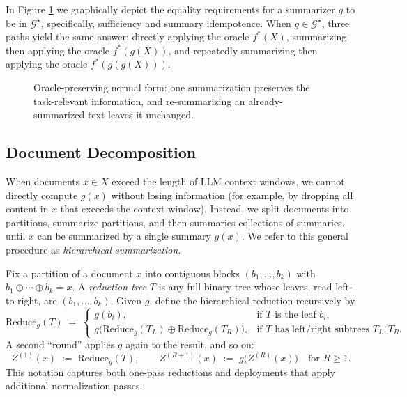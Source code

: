 \documentclass[11pt]{article}
\newcommand{\Y}{\mathcal{Y}}               %
\newcommand{\fstar}{f^*}               %
\newcommand{\Gstar}{\mathcal{G}^\star}     %
\newcommand{\concat}{\oplus}                    %
\newcommand{\metric}{d_{\Y}}
\newcommand{\reduce}{\text{Reduce}}
\newcommand{\reduceg}{\reduce_g}
\begin{document}
In Figure \ref{fig:gstar} we graphically depict the equality requirements for a summarizer $g$ to be in $\Gstar$, specifically, sufficiency and summary idempotence. When $g\in \Gstar$, three paths yield the same answer: directly applying the oracle $\fstar(X)$, summarizing then applying the oracle $\fstar(g(X))$, and repeatedly summarizing then applying the oracle $\fstar(g(g(X)))$.

\begin{figure}[t]
\centering
{}
\caption{Oracle-preserving normal form: one summarization preserves the task-relevant information, and re-summarizing an already-summarized text leaves it unchanged.}
\label{fig:gstar}
\end{figure}

\subsection{Document Decomposition}

When documents $x\in X$ exceed the length of LLM context windows, we cannot directly compute $g(x)$ without losing information (for example, by dropping all content in $x$ that exceeds the context window). Instead, we split documents into partitions, summarize partitions, and then summaries collections of summaries, until $x$ can be summarized by a single summary $g(x)$. We refer to this general procedure as \textit{hierarchical summarization}. 

Fix a partition of a document $x$ into contiguous blocks $(b_1,\ldots,b_k)$ with $b_1\concat\cdots\concat b_k=x$. A \emph{reduction tree} $T$ is any full binary tree whose leaves, read left-to-right, are $(b_1,\ldots,b_k)$. Given $g$, define the hierarchical reduction recursively by
\[
\reduceg(T)\;=\;
\begin{cases}
g(b_i), & \text{if $T$ is the leaf }b_i,\\[3pt]
g\!\big(\reduceg(T_L)\concat \reduceg(T_R)\big), & \text{if $T$ has left/right subtrees }T_L,T_R.
\end{cases}
\]
A second ``round'' applies $g$ again to the result, and so on:
\[
Z^{(1)}(x)\;:=\;\reduceg(T),\qquad
Z^{(R+ 1)}(x)\;:=\;g\!\big(Z^{(R)}(x)\big)\quad\text{for }R\ge1.
\]
This notation captures both one-pass reductions and deployments that apply additional normalization passes.
\end{document}
